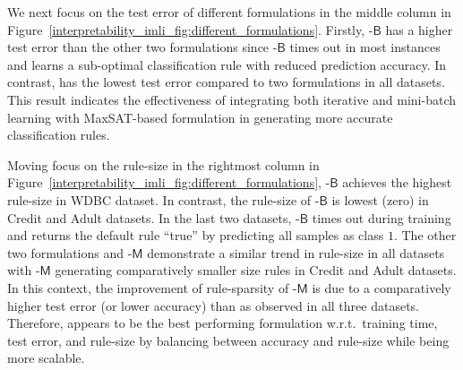 We next focus on the test error of different formulations in the middle column in Figure~\ref{interpretability_imli_fig:different_formulations}. Firstly, {\imli}-$\mathsf{B}$ has a higher test error than the other two formulations since {\imli}-$\mathsf{B}$ times out in most instances and learns a sub-optimal classification rule with reduced prediction accuracy. In contrast, {\imli} has the lowest test error compared to two formulations in all datasets. This result indicates the effectiveness of integrating both iterative and mini-batch learning with MaxSAT-based formulation in generating more accurate classification rules.


Moving focus on the rule-size in the rightmost column in Figure~\ref{interpretability_imli_fig:different_formulations}, {\imli}-$\mathsf{B}$ achieves the highest rule-size in WDBC dataset. In contrast, the rule-size of {\imli}-$\mathsf{B}$  is lowest (zero) in Credit and Adult datasets. In the last two datasets, {\imli}-$\mathsf{B}$ times out during training and returns the default rule ``true'' by predicting all samples as class $ 1 $. The other two formulations {\imli} and {\imli}-$\mathsf{M}$  demonstrate a similar trend in rule-size in all datasets with {\imli}-$\mathsf{M}$ generating comparatively smaller size rules in Credit and Adult datasets. In this context,  the improvement of rule-sparsity of {\imli}-$\mathsf{M}$ is due to a comparatively higher test error (or lower accuracy) than {\imli} as observed in all three datasets. Therefore, {\imli} appears to be the best performing formulation w.r.t.\ training time, test error, and rule-size by balancing between accuracy and rule-size while being more scalable.

